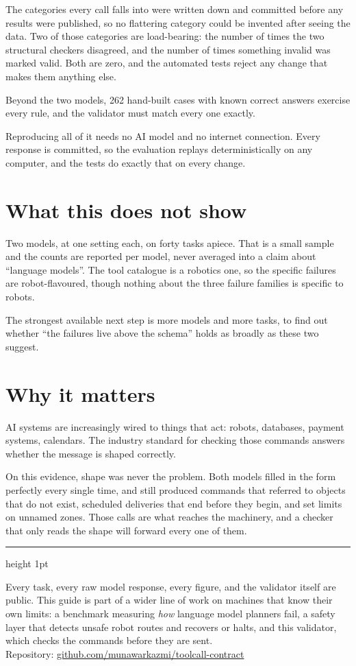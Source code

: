 \documentclass[11pt,a4paper]{article}
\begin{document}
The categories every call falls into were written down and committed before any results were published, so no flattering category could be invented after seeing the data. Two of those categories are load-bearing: the number of times the two structural checkers disagreed, and the number of times something invalid was marked valid. Both are zero, and the automated tests reject any change that makes them anything else.

Beyond the two models, 262 hand-built cases with known correct answers exercise every rule, and the validator must match every one exactly.

Reproducing all of it needs no AI model and no internet connection. Every response is committed, so the evaluation replays deterministically on any computer, and the tests do exactly that on every change.

\section{What this does not show}

Two models, at one setting each, on forty tasks apiece. That is a small sample and the counts are reported per model, never averaged into a claim about ``language models''. The tool catalogue is a robotics one, so the specific failures are robot-flavoured, though nothing about the three failure families is specific to robots.

The strongest available next step is more models and more tasks, to find out whether ``the failures live above the schema'' holds as broadly as these two suggest.

\section{Why it matters}

AI systems are increasingly wired to things that act: robots, databases, payment systems, calendars. The industry standard for checking those commands answers whether the message is shaped correctly.

On this evidence, shape was never the problem. Both models filled in the form perfectly every single time, and still produced commands that referred to objects that do not exist, scheduled deliveries that end before they begin, and set limits on unnamed zones. Those calls are what reaches the machinery, and a checker that only reads the shape will forward every one of them.

\vspace{6pt}
{\color{rule}\hrule height 1pt}
\vspace{6pt}

{\small Every task, every raw model response, every figure, and the validator itself are public. This guide is part of a wider line of work on machines that know their own limits: a benchmark measuring \emph{how} language model planners fail, a safety layer that detects unsafe robot routes and recovers or halts, and this validator, which checks the commands before they are sent.\\
Repository: \href{https://github.com/munawarkazmi/toolcall-contract}{github.com/munawarkazmi/toolcall-contract}}
\end{document}
